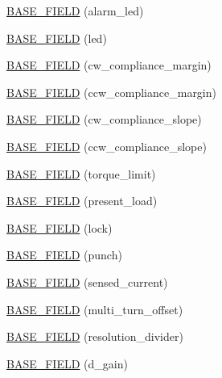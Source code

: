 \begin{DoxyCompactItemize}
\hyperlink{classdynamixel_1_1servos_1_1_base_servo_a6590f524917293ab98556346bac1981f}{B\+A\+S\+E\+\_\+\+F\+I\+E\+L\+D} (alarm\+\_\+led)
\item 
\hyperlink{classdynamixel_1_1servos_1_1_base_servo_a70470a70099add231dd287d5b69a3e05}{B\+A\+S\+E\+\_\+\+F\+I\+E\+L\+D} (led)
\item 
\hyperlink{classdynamixel_1_1servos_1_1_base_servo_abe0a74eeee4b456096d1ae2a114d91c2}{B\+A\+S\+E\+\_\+\+F\+I\+E\+L\+D} (cw\+\_\+compliance\+\_\+margin)
\item 
\hyperlink{classdynamixel_1_1servos_1_1_base_servo_aab9dc28556b2f869338111a3169829d9}{B\+A\+S\+E\+\_\+\+F\+I\+E\+L\+D} (ccw\+\_\+compliance\+\_\+margin)
\item 
\hyperlink{classdynamixel_1_1servos_1_1_base_servo_a3b9a6dda5ecd09debc17fe9fb72d255b}{B\+A\+S\+E\+\_\+\+F\+I\+E\+L\+D} (cw\+\_\+compliance\+\_\+slope)
\item 
\hyperlink{classdynamixel_1_1servos_1_1_base_servo_a84e568db5fcd8725ace1873c56545e39}{B\+A\+S\+E\+\_\+\+F\+I\+E\+L\+D} (ccw\+\_\+compliance\+\_\+slope)
\item 
\hyperlink{classdynamixel_1_1servos_1_1_base_servo_a33d2a6eed08c33fc4786404dd5399daa}{B\+A\+S\+E\+\_\+\+F\+I\+E\+L\+D} (torque\+\_\+limit)
\item 
\hyperlink{classdynamixel_1_1servos_1_1_base_servo_aa2e7a577c80aea887b05b53c76578acf}{B\+A\+S\+E\+\_\+\+F\+I\+E\+L\+D} (present\+\_\+load)
\item 
\hyperlink{classdynamixel_1_1servos_1_1_base_servo_a6a1cc09047bac429e7b50cf69a59e2e7}{B\+A\+S\+E\+\_\+\+F\+I\+E\+L\+D} (lock)
\item 
\hyperlink{classdynamixel_1_1servos_1_1_base_servo_ab9dde35a6228cfe48b2a58b0ab679de5}{B\+A\+S\+E\+\_\+\+F\+I\+E\+L\+D} (punch)
\item 
\hyperlink{classdynamixel_1_1servos_1_1_base_servo_a13f8ab07c4c2274c9b0191c7bb43a159}{B\+A\+S\+E\+\_\+\+F\+I\+E\+L\+D} (sensed\+\_\+current)
\item 
\hyperlink{classdynamixel_1_1servos_1_1_base_servo_aa57f1bf9f68d5ff6bbee12ad9de25f03}{B\+A\+S\+E\+\_\+\+F\+I\+E\+L\+D} (multi\+\_\+turn\+\_\+offset)
\item 
\hyperlink{classdynamixel_1_1servos_1_1_base_servo_a046123a7102b0f8576a5379244dab59f}{B\+A\+S\+E\+\_\+\+F\+I\+E\+L\+D} (resolution\+\_\+divider)
\item 
\hyperlink{classdynamixel_1_1servos_1_1_base_servo_a2faa22f6a3eb0ec3e01e4ca427f11ddd}{B\+A\+S\+E\+\_\+\+F\+I\+E\+L\+D} (d\+\_\+gain)
\item 

\end{DoxyCompactItemize}
